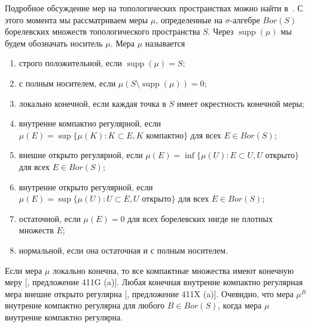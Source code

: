 \documentclass[12pt]{article}
\begin{document}
Подробное обсуждение мер на топологических пространствах можно найти
в~\cite{FremMeasTh4.1}. С этого момента мы рассматриваем меры $\mu$,
определенные на $\sigma$-алгебре $Bor(S)$ борелевских множеств топологического
пространства $S$. Через $\operatorname{supp}(\mu)$ мы будем обозначать носитель
$\mu$. Мера $\mu$ называется
\begin{enumerate}[label = (\roman*)]
    \item строго положительной, если $\operatorname{supp}(\mu)=S$;

    \item с полным носителем, если $\mu(S\setminus\operatorname{supp}(\mu))=0$;

    \item локально конечной, если каждая точка в $S$ имеет окрестность конечной
          меры;

    \item внутренне компактно регулярной, если $\mu(E)=\sup \{\mu(K): K\subset
              E, K\mbox{ компактно}\}$ для всех $E\in Bor(S)$;

    \item внешне открыто регулярной, если $\mu(E)=\inf \{\mu(U): E\subset U,
              U\mbox{ открыто}\}$ для всех $E\in Bor(S)$;

    \item внутренне открыто регулярной, если $\mu(E)=\sup \{\mu(U): U\subset E,
              U\mbox{ открыто}\}$ для всех $E\in Bor(S)$;

    \item остаточной, если $\mu(E)=0$ для всех борелевских нигде не плотных
          множеств $E$;

    \item нормальной, если она остаточная и с полным носителем.
\end{enumerate}

Если мера $\mu$ локально конечна, то все компактные множества имеют конечную
меру [\cite{FremMeasTh4.1}, предложение 411G (a)]. Любая конечная внутренне
компактно регулярная мера внешне открыто регулярна [\cite{FremMeasTh4.1},
предложение 411X (a)]. Очевидно, что мера $\mu^B$ внутренне компактно регулярна
для любого $B\in Bor(S)$, когда мера $\mu$ внутренне компактно регулярна.
\end{document}
